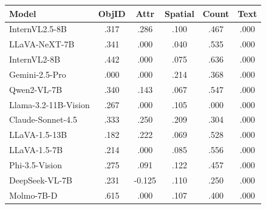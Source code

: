 \begin{tabular}{@{}lccccc@{}}
\toprule
Model & ObjID & Attr & Spatial & Count & Text \\
\midrule
InternVL2.5-8B & .317 & .286 & .100 & .467 & .000 \\
LLaVA-NeXT-7B & .341 & .000 & .040 & .535 & .000 \\
InternVL2-8B & .442 & .000 & .075 & .636 & .000 \\
Gemini-2.5-Pro & .000 & .000 & .214 & .368 & .000 \\
Qwen2-VL-7B & .340 & .143 & .067 & .547 & .000 \\
Llama-3.2-11B-Vision & .267 & .000 & .105 & .000 & .000 \\
Claude-Sonnet-4.5 & .333 & .250 & .209 & .304 & .000 \\
LLaVA-1.5-13B & .182 & .222 & .069 & .528 & .000 \\
LLaVA-1.5-7B & .214 & .000 & .085 & .556 & .000 \\
Phi-3.5-Vision & .275 & .091 & .122 & .457 & .000 \\
DeepSeek-VL-7B & .231 & -0.125 & .110 & .250 & .000 \\
Molmo-7B-D & .615 & .000 & .107 & .400 & .000 \\
\bottomrule
\end{tabular}